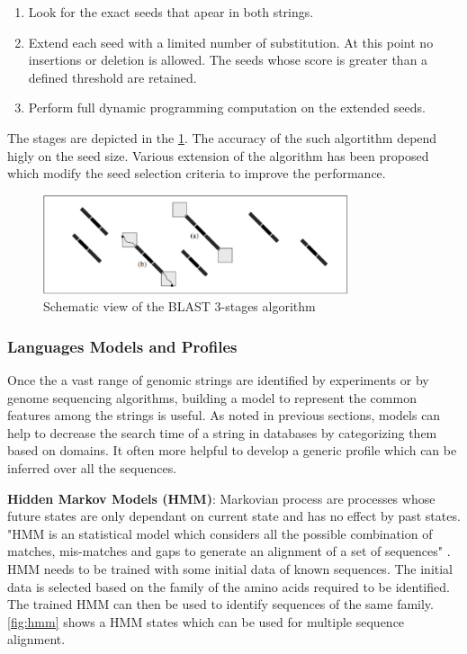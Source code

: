 \documentclass[12pt,twoside]{article}
\begin{document}
\begin{enumerate}
	\item Look for the exact seeds that apear in both strings.
	\item Extend each seed with a limited number of substitution. At this point no insertions or deletion is allowed.
		  The seeds whose score is greater than a defined threshold are retained.
	\item Perform full dynamic programming computation on the extended seeds.
\end{enumerate}

The stages are depicted in the \cref{fig:blastview}. The accuracy of the such algortithm depend higly on the seed size. Various extension of the algorithm has been proposed which
modify the seed selection criteria to improve the performance.

\begin{figure}%
    \centering
    \includegraphics[width=0.8\textwidth]{fig/blastview}
    \caption{Schematic view of the BLAST 3-stages algorithm \cite[Figure 8.11]{gokhale_reconfigurable_2010}}
    \label{fig:blastview}
\end{figure}

\subsubsection{Languages Models and Profiles}

Once the a vast range of genomic strings are identified by experiments or by genome sequencing algorithms, building
a model to represent the common features among the strings is useful. As noted in previous sections, models can help
to decrease the search time of a string in databases by categorizing them based on domains. It often more helpful
to develop a generic profile which can be inferred over all the sequences.

\begin{flushleft}
\textbf{Hidden Markov Models (HMM)}: Markovian process are processes whose future states are only dependant on current state and has no effect by past states.
"HMM \cite{hughey_hidden_1996} is an statistical model which considers all the possible combination of matches, mis-matches and gaps to generate an
alignment of a set of sequences" \cite{mount_bioinformatics:_2004}. HMM needs to be trained with some initial data of known
sequences. The initial data is selected based on the family of the amino acids required to be identified. The trained HMM 
can then be used to identify sequences of the same family. \cref{fig:hmm} shows a HMM states which can be used for multiple
sequence alignment.
\end{flushleft}
\end{document}
